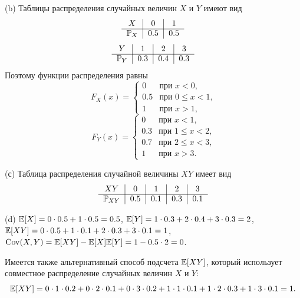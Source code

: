\documentclass[12pt, a4paper]{article}\usepackage[]{graphicx}\usepackage[]{color}
\begin{document}
(b) Таблицы распределения случайных величин $X$ и $Y$ имеют вид
\[
\begin{tabular}{c|c|c}
  $X$             & $0$     & $1$    \\ \cline{1-3}
  $\P_X$  & $0.5$   & $0.5$  \\
\end{tabular}
\]
\[
\begin{tabular}{c|c|c|c}
  $Y$             & $1$     & $2$     & $3$   \\ \cline{1-4}
  $\P_Y$  & $0.3$   & $0.4$   & $0.3$ \\
\end{tabular}
\]
Поэтому функции распределения равны
\[
F_X(x) =
                 \begin{cases}
                     0                   &   \text{при $x < 0$,} \\
                     0.5                 &   \text{при $0 \leq x < 1$,} \\
                     1                   &   \text{при $x > 1$,}
                  \end{cases}
\]
\[
F_Y(x) =
                 \begin{cases}
                     0                   &   \text{при $x < 1$,} \\
                     0.3                 &   \text{при $1 \leq x < 2$,} \\
                     0.7                 &   \text{при $2 \leq x < 3$,} \\
                     1                   &   \text{при $x > 3$.}
                  \end{cases}
\]

(с) Таблица распределения случайной величины $XY$ имеет вид
\[
\begin{tabular}{c|c|c|c|c}
  $XY$               & $0$     & $1$     & $2$     & $3$ \\ \cline{1-5}
  $\P_{XY}$  & $0.5$   & $0.1$   & $0.3$   & $0.1$ \\
\end{tabular}
\]

(d) $\mathbb{E}[X] = 0 \cdot 0.5 + 1 \cdot 0.5 = 0.5$, $\mathbb{E}[Y] = 1 \cdot 0.3 + 2 \cdot 0.4 + 3 \cdot 0.3 = 2$, $\mathbb{E}[XY] = 0 \cdot 0.5 + 1 \cdot 0.1 + 2 \cdot 0.3 + 3 \cdot 0.1 = 1$, $\operatorname{Cov}(X,Y) = \mathbb{E}[XY] - \mathbb{E}[X]\mathbb{E}[Y] = 1 - 0.5 \cdot 2 = 0$.

Имеется также альтернативный способ подсчета $\mathbb{E}[XY]$, который использует совместное распределение случайных величин $X$ и $Y$:
\[
\mathbb{E}[XY] = 0\cdot1\cdot0.2 + 0\cdot2\cdot0.1 + 0\cdot3\cdot0.2 + 1\cdot1\cdot0.1 + 1\cdot2\cdot0.3 + 1\cdot3\cdot0.1 = 1 \text{.}
\]
\end{document}
